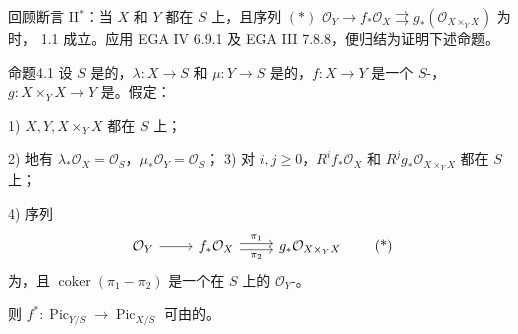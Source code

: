 回顾断言 II$^*$：当 $X$ 和 $Y$ 都在 $S$ 上，且序列 $(*)$ $\mathcal O_Y\to f_*\mathcal O_X\rightrightarrows g_*(\mathcal O_{X\times_YX})$ 为时， 1.1 成立。应用 EGA IV 6.9.1 及 EGA III 7.8.8，便归结为证明下述命题。

\begin{SGAresult}{命题}{4.1}
设 $S$ 是的，$\lambda:X\to S$ 和 $\mu:Y\to S$ 是的，$f:X\to Y$ 是一个 $S$-，$g:X\times_YX\to Y$ 是。假定：

\textup{1)} $X,Y,X\times_YX$ 都在 $S$ 上；

\textup{2)} 地有 $\lambda_*\mathcal O_X=\mathcal O_S$，$\mu_*\mathcal O_Y=\mathcal O_S$；
\textup{3)} 对 $i,j\geq0$，$R^if_*\mathcal O_X$ 和 $R^jg_*\mathcal O_{X\times_YX}$ 都在 $S$ 上；

\textup{4)} 序列
\[
\begin{tikzcd}
\mathcal O_Y\arrow[r]&f_*\mathcal O_X\arrow[r,shift left=.5ex,"\pi_1"]\arrow[r,shift right=.5ex,"\pi_2"']&g_*\mathcal O_{X\times_YX}
\end{tikzcd}\tag{*}
\]
为，且 $\operatorname{coker}(\pi_1-\pi_2)$ 是一个在 $S$ 上的 $\mathcal O_Y$-。

则 $f^*:\operatorname{Pic}_{Y/S}\to\operatorname{Pic}_{X/S}$ 可由的。
\end{SGAresult}
